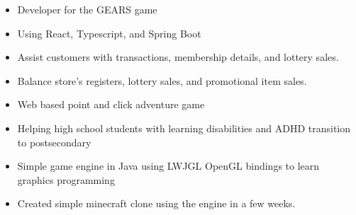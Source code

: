 \documentclass[10pt,a4paper,ragged2e,withhyper]{altacv}
\begin{document}
\begin{paracol}{2}

\begin{itemize}
\item Developer for the GEARS game
\item Using React, Typescript, and Spring Boot
\end{itemize}

\divider

\begin{itemize}
\item Assist customers with transactions, membership details, and lottery sales.
\item Balance store's registers, lottery sales, and promotional item sales.
\end{itemize}


\begin{itemize}
\item Web based point and click adventure game
\item Helping high school students with learning disabilities and ADHD transition to postsecondary
\end{itemize}

\divider

\begin{itemize}
\item Simple game engine in Java using LWJGL OpenGL bindings to learn graphics programming
\item Created simple minecraft clone using the engine in a few weeks.
\end{itemize}

\medskip



\divider



\end{paracol}
\end{document}
